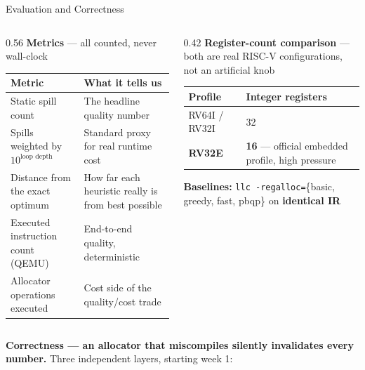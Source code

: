 \documentclass[aspectratio=169,11pt]{beamer}
\begin{document}
\begin{frame}{Evaluation and Correctness}
\vspace{-1mm}
\begin{columns}[T]
\begin{column}{0.56\textwidth}
{\scriptsize\textbf{Metrics} --- all counted, never wall-clock}\par\vspace{1mm}
{\scriptsize
\begin{tabular}{@{}p{3.3cm}p{3.6cm}@{}}
\toprule
Metric & What it tells us \\
\midrule
Static spill count & The headline quality number \\
Spills weighted by $10^{\text{loop depth}}$ & Standard proxy for real runtime cost \\
Distance from the exact optimum & How far each heuristic really is from best possible \\
Executed instruction count (QEMU) & End-to-end quality, deterministic \\
Allocator operations executed & Cost side of the quality/cost trade \\
\bottomrule
\end{tabular}}
\end{column}
\begin{column}{0.42\textwidth}
{\scriptsize\textbf{Register-count comparison} --- both are real RISC-V
configurations, not an artificial knob}\par\vspace{1mm}
{\scriptsize
\begin{tabular}{@{}p{2.1cm}p{3.1cm}@{}}
\toprule
Profile & Integer registers \\
\midrule
RV64I / RV32I & 32 \\
\textbf{RV32E} & \textbf{16} --- official embedded profile, high pressure \\
\bottomrule
\end{tabular}}\par\vspace{2mm}
{\scriptsize\textbf{Baselines:} \texttt{llc -regalloc=}\{basic, greedy, fast,
pbqp\} on \textbf{identical IR}}
\end{column}
\end{columns}
\vspace{2.5mm}
\begin{minipage}{0.97\textwidth}
{\scriptsize\textbf{Correctness --- an allocator that miscompiles silently
invalidates every number.} Three independent layers, starting week 1:}

\end{minipage}
\end{frame}
\end{document}

